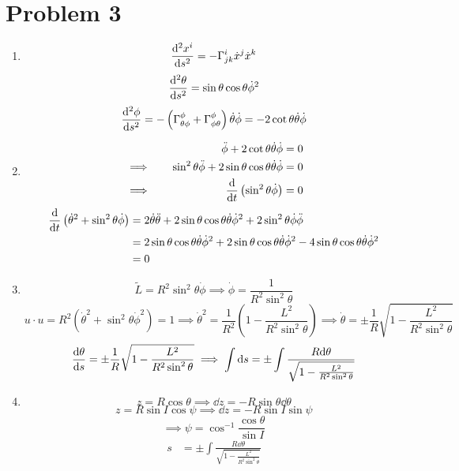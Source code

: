 \documentclass[12pt]{article}
\newcommand{\chrissym}[3]{\Gamma_{#2#3}^#1}
\begin{document}
\section*{Problem 3}
\begin{enumerate}[label=(\alph*)]
    \item 
    \[ \dv[2]{x^i}{s} = -\chrissym{i}{j}{k}\dot{x}^j\dot{x}^k \]
    \[ \dv[2]{\theta}{s} = \sin\theta\cos\theta\dot{\phi}^2 \]
    \[ \dv[2]{\phi}{s} = -\left(\chrissym{\phi}{\theta}{\phi}+\chrissym{\phi}{\phi}{\theta}\right)\dot{\theta}\dot{\phi} = -2\cot\theta\dot{\theta}\dot{\phi} \]
    \item
    \begin{alignat*}{3}
        &         \quad & \ddot{\phi} + 2\cot\theta\dot{\theta}\dot{\phi} &= 0  \\
        &\implies \quad & \sin^2\theta\ddot{\phi} + 2\sin\theta\cos\theta\dot{\theta}\dot{\phi} &= 0 \\
        &\implies \quad & \dv{t}\left(\sin^2\theta\dot{\phi}\right) &= 0 \\
    \end{alignat*}
    \begin{align*}
        \dv{t}\left(\dot{\theta}^2 + \sin^2\theta\dot{\phi}\right) &= 2\dot{\theta}\ddot{\theta} + 2\sin\theta\cos\theta\dot{\theta}\dot{\phi}^2 + 2\sin^2\theta\dot{\phi}\ddot{\phi} \\
        &= 2\sin\theta\cos\theta\dot{\theta}\dot{\phi}^2 + 2\sin\theta\cos\theta\dot{\theta}\dot{\phi}^2 - 4\sin\theta\cos\theta\dot{\theta}\dot{\phi}^2 \\
        &= 0
    \end{align*}
    \item
    \[ \tilde{L} = R^2\sin^2\theta\dot{\phi} \implies \dot{\phi} = \frac{1}{R^2\sin^2\theta} \]
    \[ u\cdot u = R^2\left(\dot{\theta}^2 + \sin^2\theta\dot{\phi}^2\right) = 1 \implies \dot{\theta}^2 = \frac{1}{R^2}\left(1 - \frac{L^2}{R^2\sin^2\theta}\right) \implies \dot{\theta} = \pm\frac{1}{R}\sqrt{1 - \frac{L^2}{R^2\sin^2\theta}} \]
    \[ \dv{\theta}{s} = \pm\frac{1}{R}\sqrt{1 - \frac{L^2}{R^2\sin^2\theta}} \implies \int\dd s = \pm\int \frac{R\dd\theta}{\sqrt{1 - \frac{L^2}{R^2\sin^2\theta}}} \]
    \item
    \[ z = R\cos\theta \implies \dd z = -R\sin\theta\dd\theta \]
    \[ z = R\sin I\cos\psi \implies \dd z = -R\sin I\sin\psi \]
    \[ \implies \psi = \cos^{-1}\frac{\cos\theta}{\sin I} \]
    \begin{align*}
        s &= \pm\int\frac{R\dd\theta}{\sqrt{1 - \frac{L^2}{R^2\sin^2\theta}}} \\

\end{align*}
\end{enumerate}
\end{document}
